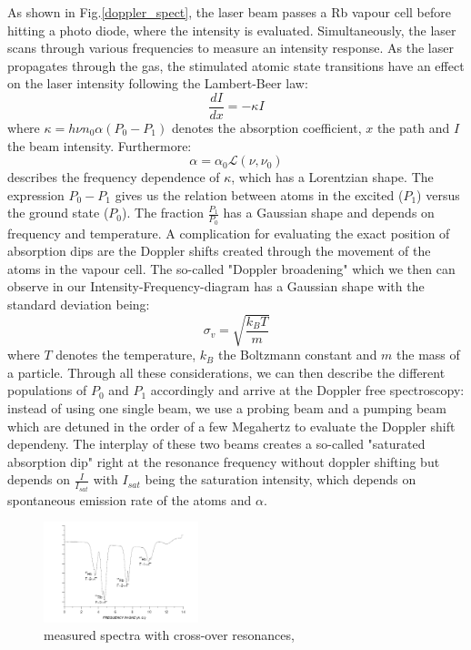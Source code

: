 \documentclass[12pt, a4paper]{article}
\begin{document}
As shown in Fig.\ref{doppler_spect}, the laser beam passes a Rb vapour cell before hitting a photo diode, where the intensity is evaluated. Simultaneously, the laser scans through various frequencies to measure an intensity response. As the laser propagates through the gas, the stimulated atomic state transitions have an effect on the laser intensity following the Lambert-Beer law:
\begin{equation}
\frac{dI}{dx}= -\kappa I
\end{equation}
where $\kappa = h\nu n_0 \alpha (P_0 - P_1)$ denotes the absorption coefficient, $x$ the path and $I$ the beam intensity. Furthermore:
\begin{equation}
\alpha = \alpha_0 \mathcal{L}(\nu , \nu_0)
\end{equation}
describes the frequency dependence of $\kappa$, which has a Lorentzian shape. The expression $P_0 - P_1$ gives us the relation between atoms in the excited ($P_1$) versus the ground state ($P_0$). The fraction $\frac{P_1}{P_0}$ has a Gaussian shape and depends on frequency and temperature.
A complication for evaluating the exact position of absorption dips are the Doppler shifts created through the movement of the atoms in the vapour cell. The so-called "Doppler broadening" which we then can observe in our Intensity-Frequency-diagram has a Gaussian shape with the standard deviation being:
\begin{equation}
\sigma_v = \sqrt{\frac{k_B T}{m}}
\end{equation}
where $T$ denotes the temperature, $k_B$ the Boltzmann constant and $m$ the mass of a particle. Through all these considerations, we can then describe the different populations of $P_0$ and $P_1$ accordingly and arrive at the Doppler free spectroscopy: instead of using one single beam, we use a probing beam and a pumping beam which are detuned in the order of a few Megahertz to evaluate the Doppler shift dependeny. The interplay of these two beams creates a so-called "saturated absorption dip" right at the resonance frequency without doppler shifting but depends on $\frac{I}{I_{sat}}$ with $I_{sat}$ being the saturation intensity, which depends on spontaneous emission rate of the atoms and $\alpha$.

\begin{figure}
    \centering
    \parbox{0.4\textwidth}{
        \centering
        \includegraphics[width=0.4\textwidth]{Rb_satabs.png}
    }

    \caption{measured spectra with cross-over resonances, \cite{script}}
    \label{measured_spec}
\end{figure}
\end{document}
